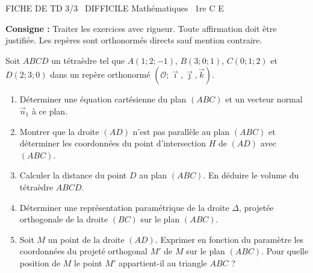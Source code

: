 \documentclass[11pt]{article}
\begin{document}
\begin{tcolorbox}[enhanced,colback=popink,colframe=popink,arc=10pt,boxrule=0pt,left=12pt,right=12pt,top=9pt,bottom=9pt]
{\color{white}\popxbold\small FICHE DE TD 3/3 \textbullet\ DIFFICILE \hfill Mathématiques \textbullet\ 1re C E\par}
\end{tcolorbox}
\vspace{4pt}
\noindent \textbf{Consigne :} Traiter les exercices avec rigueur. Toute affirmation doit être justifiée. Les repères sont orthonormés directs sauf mention contraire.

\begin{exercice}
Soit $ABCD$ un tétraèdre tel que $A(1;2;-1)$, $B(3;0;1)$, $C(0;1;2)$ et $D(2;3;0)$ dans un repère orthonormé $(\mathcal{O};\vec{\imath},\vec{\jmath},\vec{k})$.
\begin{enumerate}
    \item Déterminer une équation cartésienne du plan $(ABC)$ et un vecteur normal $\vec{n}_1$ à ce plan.
    \item Montrer que la droite $(AD)$ n'est pas parallèle au plan $(ABC)$ et déterminer les coordonnées du point d'intersection $H$ de $(AD)$ avec $(ABC)$.
    \item Calculer la distance du point $D$ au plan $(ABC)$. En déduire le volume du tétraèdre $ABCD$.
    \item Déterminer une représentation paramétrique de la droite $\Delta$, projetée orthogonale de la droite $(BC)$ sur le plan $(ABC)$.
    \item Soit $M$ un point de la droite $(AD)$. Exprimer en fonction du paramètre les coordonnées du projeté orthogonal $M'$ de $M$ sur le plan $(ABC)$. Pour quelle position de $M$ le point $M'$ appartient-il au triangle $ABC$ ?
\end{enumerate}
\end{exercice}
\end{document}
